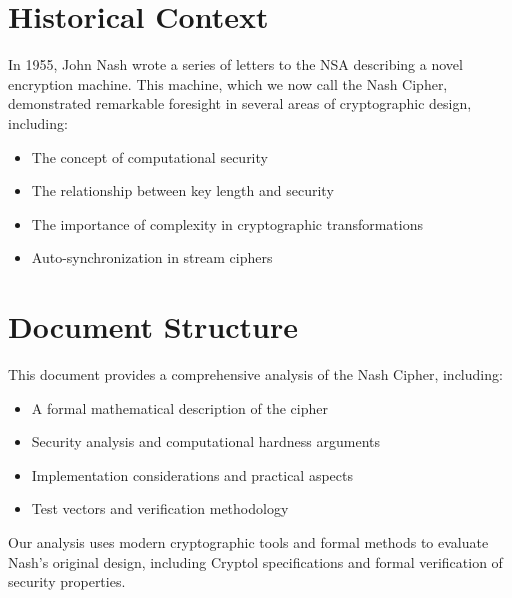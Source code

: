 \section*{Historical Context}

In 1955, John Nash wrote a series of letters to the NSA describing a novel encryption machine. 
This machine, which we now call the Nash Cipher, demonstrated remarkable foresight in several areas 
of cryptographic design, including:

\begin{itemize}
    \item The concept of computational security
    \item The relationship between key length and security
    \item The importance of complexity in cryptographic transformations
    \item Auto-synchronization in stream ciphers
\end{itemize}

\section*{Document Structure}

This document provides a comprehensive analysis of the Nash Cipher, including:

\begin{itemize}
    \item A formal mathematical description of the cipher
    \item Security analysis and computational hardness arguments
    \item Implementation considerations and practical aspects
    \item Test vectors and verification methodology
\end{itemize}

Our analysis uses modern cryptographic tools and formal methods to evaluate Nash's original design,
including Cryptol specifications and formal verification of security properties.